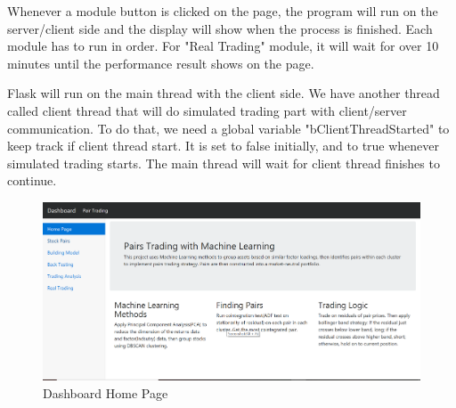 Whenever a module button is clicked on the page, the program will run on the server/client side and the display will show when the process is finished. Each module has to run in order. For "Real Trading" module, it will wait for over 10 minutes until the performance result shows on the page. 

Flask will run on the main thread with the client side. We have another thread called client thread that will do simulated trading part with client/server communication. To do that, we need a global variable "bClientThreadStarted" to keep track if client thread start. It is set to false initially, and to true whenever simulated trading starts. The main thread will wait for client thread finishes to continue.

\begin{figure}
\centering
\includegraphics[scale=0.4]{performance_analysis/images/dashboard.png}
\caption{Dashboard Home Page}
\label{fig:dashboard}
\end{figure}

